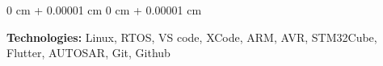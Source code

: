 \documentclass[10pt, letterpaper]{article}
\newenvironment{onecolentry}{
    \begin{adjustwidth}{
        0 cm + 0.00001 cm
    }{
        0 cm + 0.00001 cm
    }
}{
    \end{adjustwidth}
} %
\begin{document}
                                \vspace{0.2 cm}
                        
                            \begin{onecolentry}     
                                        \textbf{Technologies: } Linux,  RTOS,  VS code,  XCode,  ARM,  AVR,  STM32Cube,  Flutter,  AUTOSAR,  Git,  Github
                                \end{onecolentry}
                        
    
\end{document}

